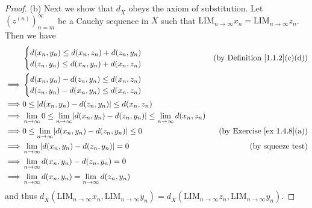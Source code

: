 \begin{proof}{(b)}
    Next we show that \(d_{\overline{X}}\) obeys the axiom of substitution.
    Let \((z^{(n)})_{n = m}^\infty\) be a Cauchy sequence in \(X\) such that \(\text{LIM}_{n \to \infty} x_n = \text{LIM}_{n \to \infty} z_n\).
    Then we have
    \begin{align*}
                 & \begin{cases}
            d(x_n, y_n) \leq d(x_n, z_n) + d(z_n, y_n) \\
            d(z_n, y_n) \leq d(x_n, y_n) + d(x_n, z_n)
        \end{cases}                                                                                           & \text{(by Definition \ref{1.1.2}(c)(d))} \\
        \implies & \begin{cases}
            d(x_n, y_n) - d(z_n, y_n) \leq d(x_n, z_n) \\
            d(z_n, y_n) - d(x_n, y_n) \leq d(x_n, z_n)
        \end{cases}                                                                                                                                      \\
        \implies & 0 \leq \abs*{d(x_n, y_n) - d(z_n, y_n)} \leq d(x_n, z_n)                                                                                                        \\
        \implies & \lim_{n \to \infty} 0 \leq \lim_{n \to \infty} \abs*{d(x_n, y_n) - d(z_n, y_n)} \leq \lim_{n \to \infty} d(x_n, z_n)                                            \\
        \implies & 0 \leq \lim_{n \to \infty} \abs*{d(x_n, y_n) - d(z_n, y_n)} \leq 0                                                   & \text{(by Exercise \ref{ex 1.4.8}(a))}   \\
        \implies & \lim_{n \to \infty} \abs*{d(x_n, y_n) - d(z_n, y_n)} = 0                                                             & \text{(by squeeze test)}                 \\
        \implies & \lim_{n \to \infty} d(x_n, y_n) - d(z_n, y_n) = 0                                                                                                               \\
        \implies & \lim_{n \to \infty} d(x_n, y_n) = \lim_{n \to \infty} d(z_n, y_n)
    \end{align*}
    and thus \(d_{\overline{X}}(\text{LIM}_{n \to \infty} x_n, \text{LIM}_{n \to \infty} y_n) = d_{\overline{X}}(\text{LIM}_{n \to \infty} z_n, \text{LIM}_{n \to \infty} y_n)\).


\end{proof}
